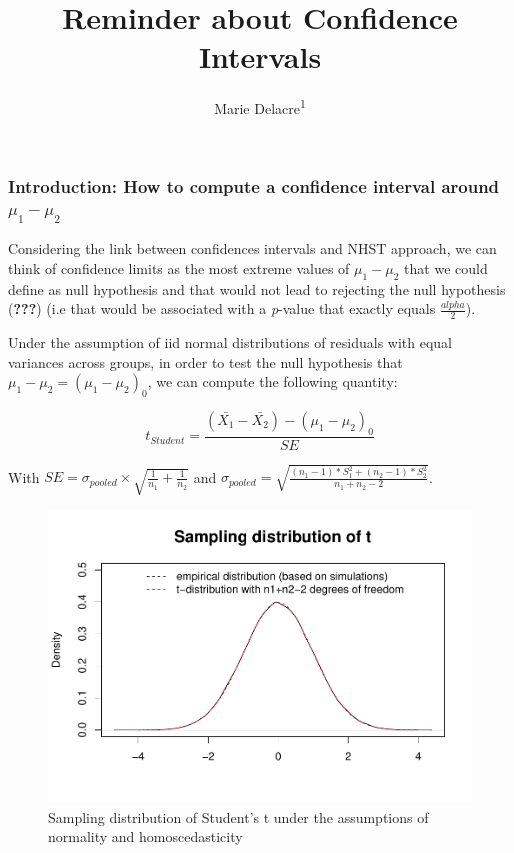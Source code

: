 \documentclass[
  man,floatsintext]{apa6}
\affiliation{
\vspace{0.5cm}
\textsuperscript{1} ULB}
\title{Reminder about Confidence Intervals}
\author{Marie Delacre\textsuperscript{1}}
\date{}
\begin{document}
\maketitle

\hypertarget{introduction-how-to-compute-a-confidence-interval-around-mu_1-mu_2}{%
\subsubsection{\texorpdfstring{Introduction: How to compute a confidence interval around \(\mu_1-\mu_2\)}{Introduction: How to compute a confidence interval around \textbackslash mu\_1-\textbackslash mu\_2}}\label{introduction-how-to-compute-a-confidence-interval-around-mu_1-mu_2}}

Considering the link between confidences intervals and NHST approach, we can think of confidence limits as the most extreme values of \(\mu_1-\mu_2\) that we could define as null hypothesis and that would not lead to rejecting the null hypothesis ({\textbf{???}}) (i.e that would be associated with a \emph{p}-value that exactly equals \(\frac{alpha}{2}\)).

Under the assumption of iid normal distributions of residuals with equal variances across groups, in order to test the null hypothesis that \(\mu_1-\mu_2= (\mu_1-\mu_2)_0\), we can compute the following quantity:

\begin{equation} 
t_{Student}=\frac{(\bar{X_1}-\bar{X_2})-(\mu_1-\mu_2)_0}{SE}
\label{eq:tstudent}
\end{equation}

With \(SE = \sigma_{pooled} \times \sqrt{\frac{1}{n_1}+\frac{1}{n_2}}\) and \(\sigma_{pooled} = \sqrt{\frac{(n_1-1)*S^2_1+(n_2-1)*S^2_2}{n_1+n_2-2}}\).

\begin{figure}
\centering
\includegraphics{CI_files/figure-latex/SAMPLMEANDIFF1-1.pdf}
\caption{\label{fig:SAMPLMEANDIFF1}Sampling distribution of Student's t under the assumptions of normality and homoscedasticity}
\end{figure}
\end{document}
